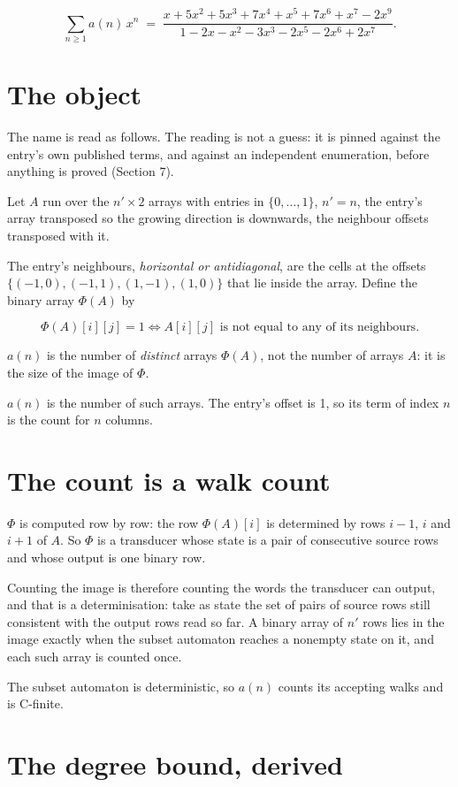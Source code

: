 \documentclass[11pt]{article}
\theoremstyle{definition}
\begin{document}
\[\sum_{n \ge 1} a(n)\,x^n \;=\; \frac{x + 5x^{2} + 5x^{3} + 7x^{4} + x^{5} + 7x^{6} + x^{7} - 2x^{9}}{1 - 2x - x^{2} - 3x^{3} - 2x^{5} - 2x^{6} + 2x^{7}}.\]

\section{The object}

The name is read as follows. The reading is not a guess: it is pinned against the entry's own published terms, and against an independent enumeration, before anything is proved (Section 7).

Let $A$ run over the $n' \times 2$ arrays with entries in $\{0,\dots,1\}$, $n' = n$, the entry's array transposed so the growing direction is downwards, the neighbour offsets transposed with it.

The entry's neighbours, {\itshape horizontal or antidiagonal}, are the cells at the offsets $\{(-1,0), (-1,1), (1,-1), (1,0)\}$ that lie inside the array. Define the binary array $\Phi(A)$ by

\[\Phi(A)[i][j] = 1 \iff A[i][j] \text{ is not equal to any of its neighbours}.\]

$a(n)$ is the number of {\itshape distinct} arrays $\Phi(A)$, not the number of arrays $A$: it is the size of the image of $\Phi$.

$a(n)$ is the number of such arrays. The entry's offset is 1, so its term of index $n$ is the count for $n$ columns.

\section{The count is a walk count}

$\Phi$ is computed row by row: the row $\Phi(A)[i]$ is determined by rows $i-1$, $i$ and $i+1$ of $A$. So $\Phi$ is a transducer whose state is a pair of consecutive source rows and whose output is one binary row.

Counting the image is therefore counting the words the transducer can output, and that is a determinisation: take as state the set of pairs of source rows still consistent with the output rows read so far. A binary array of $n'$ rows lies in the image exactly when the subset automaton reaches a nonempty state on it, and each such array is counted once.

The subset automaton is deterministic, so $a(n)$ counts its accepting walks and is C-finite.

\section{The degree bound, derived}
\end{document}
